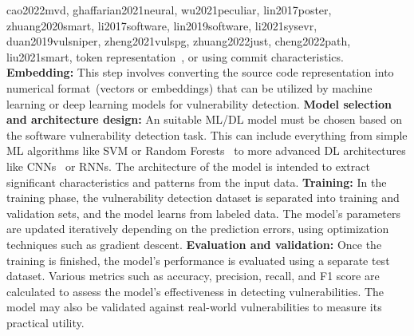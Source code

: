 {cao2022mvd,
ghaffarian2021neural,
wu2021peculiar,
lin2017poster,
zhuang2020smart,
li2017software,
lin2019software,
li2021sysevr,
duan2019vulsniper,
zheng2021vulspg,
zhuang2022just,
cheng2022path,
liu2021smart}, token representation~\cite{3429444,
8594942,
3327890,
hin2022linevd,
le2018maximal,
chen2021neural,
scandariato2014predicting,
ziems2021security,
filus2020random}, or using commit characteristics. \noindent \textbf{Embedding:} This step involves converting the source code representation into numerical format~\cite{3429444,
8594942,
3327890,
hin2022linevd,
fu2022linevul,
le2018maximal,
cao2022mvd,
ghaffarian2021neural,
lin2017poster,
scandariato2014predicting,
perl2015vccfinder}(vectors or embeddings) that can be utilized by machine learning or deep learning models for vulnerability detection. \noindent \textbf{Model selection and architecture design:} An suitable ML/DL model must be chosen based on the software vulnerability detection task. This can include everything from simple ML algorithms like SVM or Random Forests~\cite{chen2020machine,
sabetta2018practical,
zhou2017automated} to more advanced DL architectures like CNNs~\cite{hoang2019deepjit,
yan2021han,
8594942} or RNNs. The architecture of the model is intended to extract significant characteristics and patterns from the input data. \noindent \textbf{Training:} In the training phase, the vulnerability detection dataset is separated into training and validation sets, and the model learns from labeled data. The model's parameters are updated iteratively depending on the prediction errors, using optimization techniques such as gradient descent. \noindent \textbf{Evaluation and validation:} Once the training is finished, the model's performance is evaluated using a separate test dataset. Various metrics such as accuracy, precision, recall, and F1 score are calculated to assess the model's effectiveness in detecting vulnerabilities. The model may also be validated against real-world vulnerabilities to measure its practical utility.

